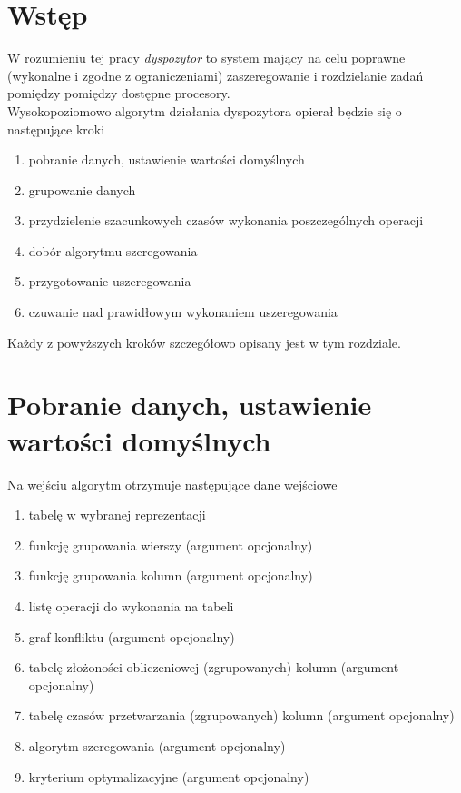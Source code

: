 \documentclass[brudnopis]{xmgr}
\begin{document}
\section{Wstęp}

W rozumieniu tej pracy \emph{dyspozytor} to system mający na celu poprawne (wykonalne i zgodne z ograniczeniami) zaszeregowanie i rozdzielanie zadań pomiędzy pomiędzy dostępne procesory.
\medskip\\

Wysokopoziomowo algorytm działania dyspozytora opierał będzie się o następujące kroki

\begin{enumerate}
    \item pobranie danych, ustawienie wartości domyślnych
    \item grupowanie danych
    \item przydzielenie szacunkowych czasów wykonania poszczególnych operacji
    \item dobór algorytmu szeregowania 
    \item przygotowanie uszeregowania
    \item czuwanie nad prawidłowym wykonaniem uszeregowania
\end{enumerate}

Każdy z powyższych kroków szczegółowo opisany jest w tym rozdziale.
\newpage

\section{Pobranie danych, ustawienie wartości domyślnych}

Na wejściu algorytm otrzymuje następujące dane wejściowe

\begin{enumerate}
    \item tabelę w wybranej reprezentacji
    \item funkcję grupowania wierszy (argument opcjonalny)
    \item funkcję grupowania kolumn (argument opcjonalny)
    \item listę operacji do wykonania na tabeli
    \item graf konfliktu (argument opcjonalny)
    \item tabelę złożoności obliczeniowej (zgrupowanych) kolumn (argument opcjonalny)
    \item tabelę czasów przetwarzania (zgrupowanych) kolumn (argument opcjonalny)
    \item algorytm szeregowania (argument opcjonalny)
    \item kryterium optymalizacyjne (argument opcjonalny)
\end{enumerate}
\end{document}
